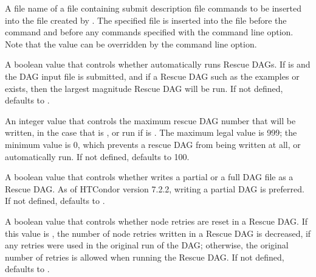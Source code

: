 \begin{description}
\label{param:DAGManInsertSubFile}
\item[\Macro{DAGMAN\_INSERT\_SUB\_FILE}]
  A file name of a file containing submit description file commands to be
  inserted into the  file created by .
  The specified file is inserted into the  file before
  the  command and before any commands specified with the
    command line option.
  Note that the  value can be overridden
  by the   command line option.

\label{param:DAGManAutoRescue}
\item[\Macro{DAGMAN\_AUTO\_RESCUE}]
  A boolean value that controls whether  automatically
  runs Rescue DAGs.  If  is 
  and the DAG input file  is submitted,
  and if a Rescue DAG such as the examples  or
   exists, 
  then the largest magnitude Rescue DAG will be run.
  If not defined,  defaults to .

\label{param:DAGManMaxRescueNum}
\item[\Macro{DAGMAN\_MAX\_RESCUE\_NUM}]
  An integer value that controls the maximum rescue DAG
  number that will be written, 
  in the case that  is ,
  or run if  is .
  The maximum legal value is 999; the minimum value is 0,
  which prevents a rescue DAG from being written at all,
  or automatically run.
  If not defined,  defaults to 100.

\label{param:DAGManWritePartialRescue}
\item[\Macro{DAGMAN\_WRITE\_PARTIAL\_RESCUE}]
  A boolean value that controls whether  writes a partial
  or a full DAG file as a Rescue DAG.  
  As of HTCondor version 7.2.2, writing a partial DAG is preferred.
  If not defined,  defaults to
  .

\label{param:DAGManResetRetriesUponRescue}
\item[\Macro{DAGMAN\_RESET\_RETRIES\_UPON\_RESCUE}]
  A boolean value that controls whether node retries are reset in a Rescue
  DAG.  If this value is , the number of node retries written
  in a Rescue DAG is decreased,
  if any retries were used in the original run of the DAG; 
  otherwise, the original number of retries is allowed
  when running the Rescue DAG.
  If not defined,  defaults to
  .


\end{description}
